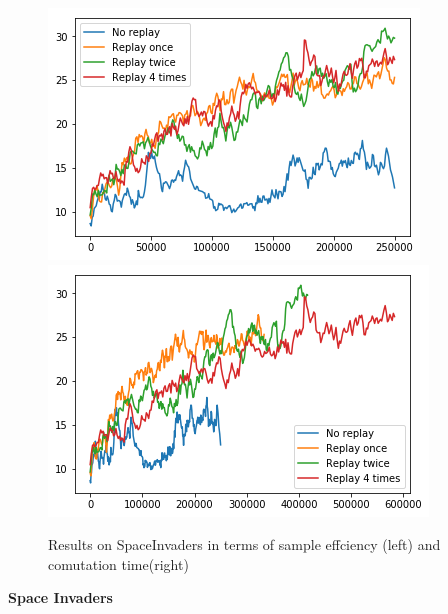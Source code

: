 \begin{figure}[h]
\includegraphics[scale=0.5]{bilder/spaceinvbyonline.png}
\includegraphics[scale=0.5]{bilder/spaceinvbytime.png}
\caption{ Results on SpaceInvaders in terms of sample effciency (left) and comutation time(right)}
\end{figure}
\textbf{Space Invaders}

